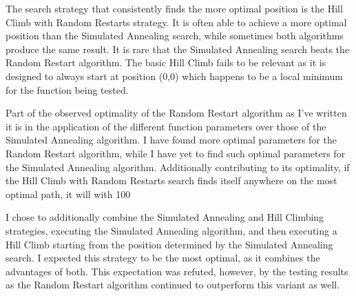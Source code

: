 \documentclass[11pt]{article} %
\begin{document}
The search strategy that consistently finds the more optimal position is the Hill Climb with Random Restarts strategy. It is often able to achieve a more optimal position than the Simulated Annealing search, while sometimes both algorithms produce the same result. It is rare that the Simulated Annealing search beats the Random Restart algorithm. The basic Hill Climb fails to be relevant as it is designed to always start at position (0,0) which happens to be a local minimum for the function being tested. 

Part of the observed optimality of the Random Restart algorithm as I've written it is in the application of the different function parameters over those of the Simulated Annealing algorithm. I have found more optimal parameters for the Random Restart algorithm, while I have yet to find such optimal parameters for the Simulated Annealing algorithm. Additionally contributing to its optimality, if the Hill Climb with Random Restarts search finds itself anywhere on the most optimal path, it will with 100%

I chose to additionally combine the Simulated Annealing and Hill Climbing strategies, executing the Simulated Annealing algorithm, and then executing a Hill Climb starting from the position determined by the Simulated Annealing search. I expected this strategy to be the most optimal, as it combines the advantages of both. This expectation was refuted, however, by the testing results as the Random Restart algorithm continued to outperform this variant as well.
\end{document}

